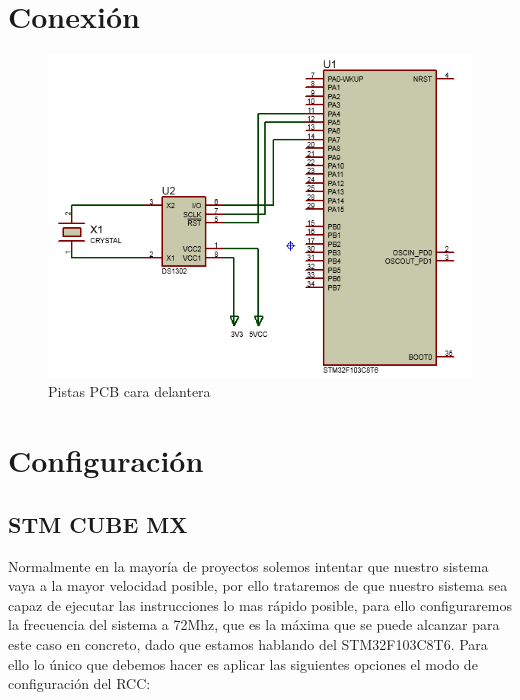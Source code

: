 \documentclass[10pt,a4paper,oneside]{article}
\begin{document}
\section*{Conexión}

\begin{figure}[H]
\centering
\includegraphics[scale=0.5]{Imagenes/DS1302_MCU_CONECTION.png}
\caption[Vista de las pistas de la cara delantera de la PCB tras el proceso de insolado]{Pistas PCB cara delantera}
\label{fig:001}
\end{figure}

\vspace{0.5cm}

\section{Configuración}
\subsection{STM CUBE MX}%
Normalmente en la mayoría de proyectos solemos intentar que nuestro sistema vaya a la mayor velocidad posible, por ello trataremos de que nuestro sistema sea capaz de ejecutar las instrucciones lo mas rápido posible, para ello configuraremos la frecuencia del sistema a 72Mhz, que es la máxima que se puede alcanzar para este caso en concreto, dado que estamos hablando del STM32F103C8T6.
Para ello lo único que debemos hacer es aplicar las siguientes opciones el modo de configuración del RCC:
\end{document}
